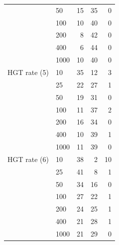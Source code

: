 \begin{table}[h!]
\begin{tabular}{llrrr}
   & 50   &            15 &     35 &           0 \\
   & 100  &            10 &     40 &           0 \\
   & 200  &             8 &     42 &           0 \\
   & 400  &              6 &     44 &           0\\
   & 1000 &             10 &     40 &           0 \\ \hline
   HGT rate (5) & 10   & 35 &     12 &           3    \\
   & 25   &             22 &     27 &           1 \\
   & 50   &            19 &     31 &           0  \\
   & 100  &            11 &     37 &           2\\
   & 200  &            16 &     34 &           0\\
   & 400  &            10 &     39 &           1 \\
   & 1000 &            11 &     39 &           0 \\  \hline
       HGT rate (6)  & 10   &     38 &      2 &          10  \\
   & 25   &            41 &      8 &           1 \\
   & 50   &            34 &     16 &           0 \\
   & 100  &           27 &     22 &           1 \\
   & 200  &             24 &     25 &           1 \\
   & 400  &            21 &     28 &           1  \\
   & 1000 &            21 &     29 &           0 \\

\end{tabular}
\label{hgt::table13}
\end{table}

